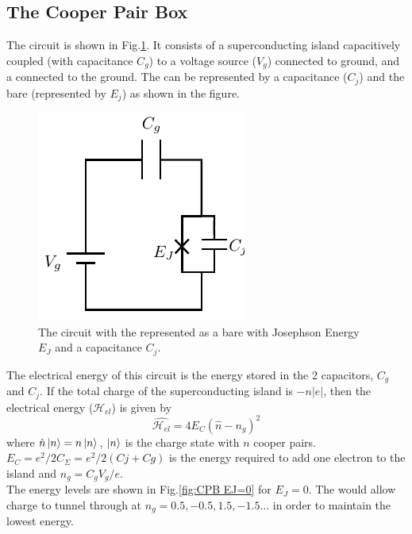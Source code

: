 \subsection{The Cooper Pair Box}

The \CPB circuit is shown in Fig.\ref{fig:cooperpairbox}. It consists of a superconducting island capacitively coupled (with capacitance $C_g$) to a voltage source ($V_g$) connected to ground, and a \JJ connected to the ground. The \JJ can be represented by a capacitance ($C_j$) and the bare \JJ (represented by $E_j$) as shown in the figure.

\begin{figure}
\centering
\includegraphics{Figures/CPB}
\decoRule
\caption[\CPB circuit]{The \CPB circuit with the \JJ represented as a bare \JJ with Josephson Energy $E_J$ and a capacitance $C_j$.}
\label{fig:cooperpairbox}
\end{figure}

The electrical energy of this circuit is the energy stored in the 2 capacitors, $C_g$ and $C_j$. If the total charge of the superconducting island is $-n|e|$, then the electrical energy ($\mathcal{H}_{el}$) is given by \cite{Schuster2007}
\begin{equation}
\hat{\mathcal{H}_{el}}=4E_C(\hat{n}-n_g)^2
\end{equation}
where $\hat{n}\ket{n}=n\ket{n}$, $\ket{n}$ is the charge state with $n$ cooper pairs.\\
$E_C=e^2/2C_\Sigma=e^2/2(Cj+Cg)$ is the energy required to add one electron to the island and $n_g=C_gV_g/e$.\\
The energy levels are shown in Fig.\ref{fig:CPB EJ=0} for $E_J=0$. The \JJ would allow charge to tunnel through at $n_g=0.5,-0.5,1.5,-1.5\ldots$ in order to maintain the lowest energy.

